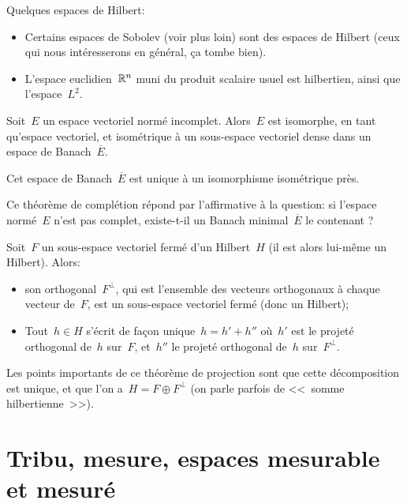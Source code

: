 \medskip
Quelques espaces de Hilbert:
\begin{itemize}
  \item Certains espaces de Sobolev (voir plus loin) sont des espaces de Hilbert (ceux qui nous intéresserons
en général, ça tombe bien).
  \item L'espace euclidien~$\mathbb R^n$ muni du produit scalaire
usuel est hilbertien, ainsi que l'espace~$L^2$.
\end{itemize}


\begin{theoreme}\label{th:complbanach}
Soit~$E$ un espace vectoriel normé incomplet.
Alors~$E$ est isomorphe, en tant qu'espace vectoriel, et isométrique à un sous-espace
vectoriel dense dans un espace de Banach~$\overline{E}$.

Cet espace de Banach~$\overline{E}$ est unique à un isomorphisme isométrique près.
\end{theoreme}

Ce théorème de complétion répond par l'affirmative à la question:
si l'espace normé~$E$ n'est pas complet, existe-t-il un Banach minimal~$\overline{E}$ le
contenant ?

\begin{theoreme}\label{th:projHilbert}
Soit~$F$ un sous-espace vectoriel fermé d'un Hilbert~$H$ (il est alors lui-même un Hilbert).
Alors:
\begin{itemize}
  \item son orthogonal~$F^\bot$, qui est l'ensemble des vecteurs orthogonaux à chaque
	vecteur de~$F$, est un sous-espace vectoriel fermé (donc un Hilbert);
  \item Tout~$h\in H$ s'écrit de façon unique~$h=h'+h''$ où~$h'$ est le projeté
	orthogonal de~$h$ sur~$F$, et~$h''$ le projeté orthogonal de~$h$ sur~$F^\bot$.
\end{itemize}
\end{theoreme}

Les points importants de ce théorème de projection sont que cette décomposition est
unique, et que l'on a~$H=F\oplus F^\bot$ (on parle parfois de <<~somme hilbertienne~>>).


\section{Tribu, mesure, espaces mesurable et mesuré}

